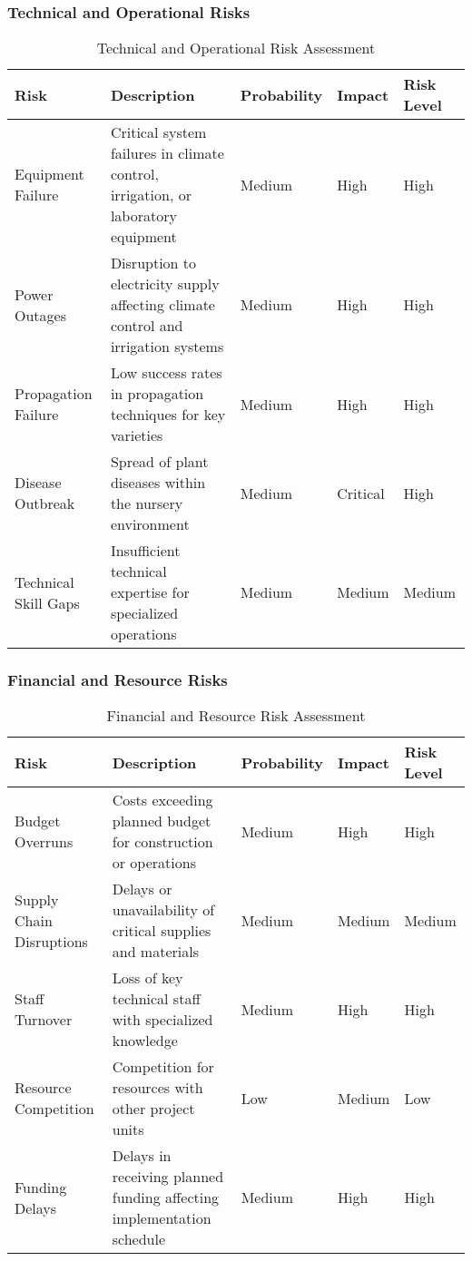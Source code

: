 \subsubsection{Technical and Operational Risks}

\begin{table}[h]
\centering
\begin{tabular}{|p{3cm}|p{4cm}|p{2cm}|p{2cm}|p{3cm}|}
\hline
\textbf{Risk} & \textbf{Description} & \textbf{Probability} & \textbf{Impact} & \textbf{Risk Level} \\
\hline
Equipment Failure & Critical system failures in climate control, irrigation, or laboratory equipment & Medium & High & High \\
\hline
Power Outages & Disruption to electricity supply affecting climate control and irrigation systems & Medium & High & High \\
\hline
Propagation Failure & Low success rates in propagation techniques for key varieties & Medium & High & High \\
\hline
Disease Outbreak & Spread of plant diseases within the nursery environment & Medium & Critical & High \\
\hline
Technical Skill Gaps & Insufficient technical expertise for specialized operations & Medium & Medium & Medium \\
\hline
\end{tabular}
\caption{Technical and Operational Risk Assessment}
\end{table}

\subsubsection{Financial and Resource Risks}

\begin{table}[h]
\centering
\begin{tabular}{|p{3cm}|p{4cm}|p{2cm}|p{2cm}|p{3cm}|}
\hline
\textbf{Risk} & \textbf{Description} & \textbf{Probability} & \textbf{Impact} & \textbf{Risk Level} \\
\hline
Budget Overruns & Costs exceeding planned budget for construction or operations & Medium & High & High \\
\hline
Supply Chain Disruptions & Delays or unavailability of critical supplies and materials & Medium & Medium & Medium \\
\hline
Staff Turnover & Loss of key technical staff with specialized knowledge & Medium & High & High \\
\hline
Resource Competition & Competition for resources with other project units & Low & Medium & Low \\
\hline
Funding Delays & Delays in receiving planned funding affecting implementation schedule & Medium & High & High \\
\hline
\end{tabular}
\caption{Financial and Resource Risk Assessment}
\end{table}

